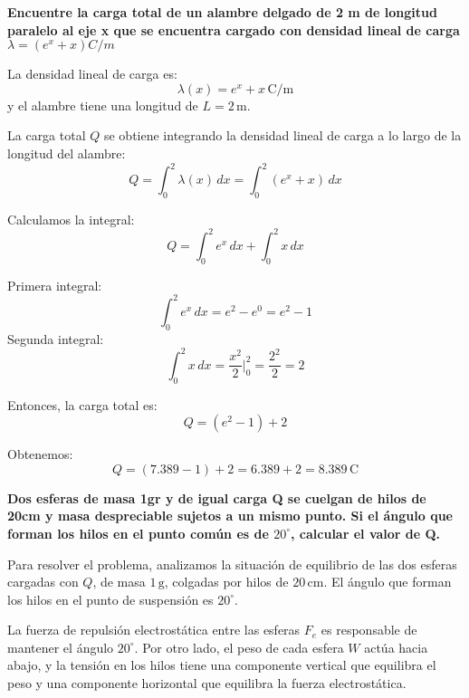 \documentclass[answers]{exam} %
\begin{document}
\begin{questions}
	\vspace{0.5cm}

	\question \large\textbf{Encuentre la carga total de un alambre delgado de 2 m de longitud paralelo al eje x que se encuentra cargado con densidad lineal de carga $\lambda = (e^x + x) C/m$  }

	\vspace{0.5cm}

	\begin{multicols}{2} %
		La densidad lineal de carga es:
		\[
			\lambda(x) = e^x + x \, \text{C/m}
		\]
		y el alambre tiene una longitud de \( L = 2 \, \text{m} \).

		La carga total \( Q \) se obtiene integrando la densidad lineal de carga a lo largo de la longitud del alambre:
		\[
			Q = \int_0^2 \lambda(x) \, dx = \int_0^2 (e^x + x) \, dx
		\]

		Calculamos la integral:
		\[
			Q = \int_0^2 e^x \, dx + \int_0^2 x \, dx
		\]

		Primera integral:
		\[
			\int_0^2 e^x \, dx = e^2 - e^0 = e^2 - 1
		\]
		Segunda integral:
		\[
			\int_0^2 x \, dx = \frac{x^2}{2} \Bigg|_0^2 = \frac{2^2}{2} = 2
		\]

		Entonces, la carga total es:
		\[
			Q = (e^2 - 1) + 2
		\]

		Obtenemos:
		\[
			Q = (7.389 - 1) + 2 = 6.389 + 2 = 8.389 \, \text{C}
		\]
	\end{multicols}

	\vspace{0.5cm}

	\question \large\textbf{Dos esferas de masa 1gr y de igual carga Q se cuelgan de hilos de 20cm y masa despreciable sujetos a un mismo punto. Si el ángulo que forman los hilos en el punto
		común es de $20^{\circ}$, calcular el valor de Q.  }

	\begin{multicols}{2} %
		Para resolver el problema, analizamos la situación de equilibrio de las dos esferas cargadas con \( Q \), de masa \( 1 \, \text{g} \), colgadas por hilos de \( 20 \, \text{cm} \). El ángulo que forman los hilos en el punto de suspensión es \( 20^\circ \).

		La fuerza de repulsión electrostática entre las esferas \( F_e \) es responsable de mantener el ángulo \( 20^\circ \). Por otro lado, el peso de cada esfera \( W \) actúa hacia abajo, y la tensión en los hilos tiene una componente vertical que equilibra el peso y una componente horizontal que equilibra la fuerza electrostática.


\end{multicols}
\end{questions}
\end{document}
